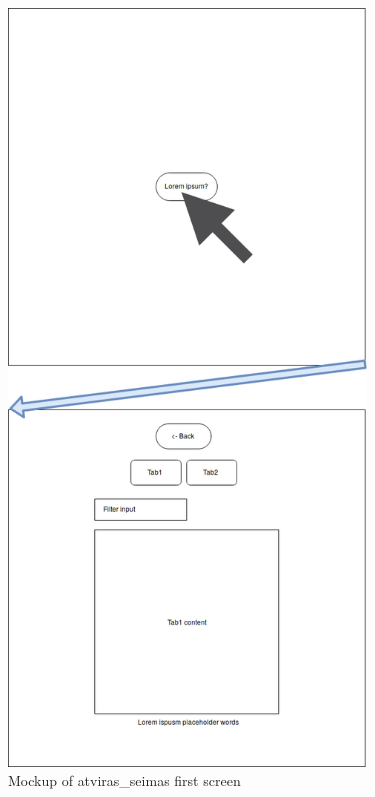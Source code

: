 \documentclass[a4paper,12pt]{article}
\begin{document}
  	\begin{figure}[H]	
    	\centering
    	\includegraphics[width=9.5cm]{images/frontend_mockup_crop_1.png}
    	\caption{Mockup of \gls{atviras_seimas} first screen}
    	\label{fig:frontend_mockup}
    \end{figure}
\end{document}
